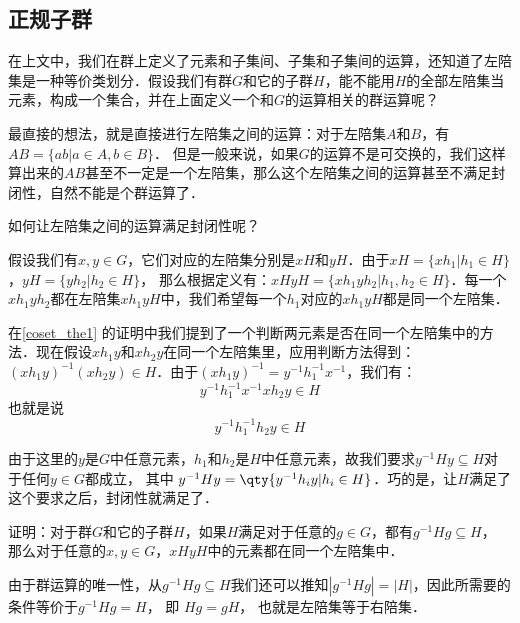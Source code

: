 

\subsection{正规子群}

在上文中，我们在群上定义了元素和子集间、子集和子集间的运算，还知道了左陪集是一种等价类划分．假设我们有群$G$和它的子群$H$，能不能用$H$的全部左陪集当元素，构成一个集合，并在上面定义一个和$G$的运算相关的群运算呢？

最直接的想法，就是直接进行左陪集之间的运算：对于左陪集$A$和$B$，有$AB=\{ab|a\in A, b\in B\}$． 但是一般来说，如果$G$的运算不是可交换的，我们这样算出来的$AB$甚至不一定是一个左陪集，那么这个左陪集之间的运算甚至不满足封闭性，自然不能是个群运算了．

如何让左陪集之间的运算满足封闭性呢？

假设我们有$x, y\in G$，它们对应的左陪集分别是$xH$和$yH$．由于$xH=\{xh_1|h_1\in H\}$，$yH=\{yh_2|h_2\in H\}$， 那么根据定义有：$xHyH=\{xh_1yh_2|h_1, h_2\in H\}$．每一个$xh_1yh_2$都在左陪集$xh_1yH$中，我们希望每一个$h_1$对应的$xh_1yH$都是同一个左陪集．

在\autoref{coset_the1} 的证明中我们提到了一个判断两元素是否在同一个左陪集中的方法．现在假设$xh_1y$和$xh_2y$在同一个左陪集里，应用判断方法得到：$(xh_1y)^{-1}(xh_2y)\in H$．由于$(xh_1y)^{-1}=y^{-1}h_1^{-1}x^{-1}$，我们有：
\begin{equation}
y^{-1}h_1^{-1}x^{-1}xh_2y\in H
\end{equation}
也就是说
\begin{equation}
y^{-1}h^{-1}_1h_2y\in H
\end{equation}

由于这里的$y$是$G$中任意元素，$h_1$和$h_2$是$H$中任意元素，故我们要求$y^{-1}Hy\subseteq H$对于任何$y\in G$都成立， 其中 $y^{-1}Hy = \qty{y^{-1}h_i y|h_i \in H}$．巧的是，让$H$满足了这个要求之后，封闭性就满足了．

\begin{exercise}{}\label{NormSG_exe1}
证明：对于群$G$和它的子群$H$，如果$H$满足对于任意的$g\in G$，都有$g^{-1}Hg\subseteq H$， 那么对于任意的$x, y\in G$，$xHyH$中的元素都在同一个左陪集中．
\end{exercise}

\begin{corollary}{}\label{NormSG_cor1}
由于群运算的唯一性，从$g^{-1}Hg\subseteq H$我们还可以推知$|g^{-1}Hg|=|H|$，因此所需要的条件等价于$g^{-1}Hg=H$， 即 $Hg = gH$， 也就是左陪集等于右陪集．
\end{corollary}

